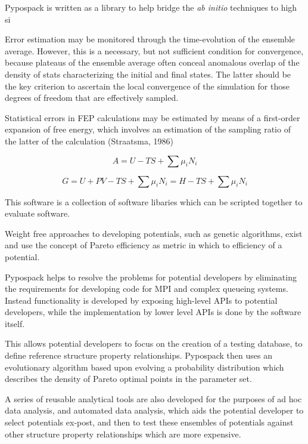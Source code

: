 Pypospack is written as a library to help bridge the \emph{ab initio} techniques to high si



Error estimation may be monitored through the time-evolution of the ensemble average.  However, this is a necessary, but not sufficient condition for convergence, because plateaus of the ensemble average often conceal anomalous overlap of the density of stats characterizing the initial and final states.  The latter should be the key criterion to ascertain the local convergence of the simulation for those degrees of freedom that are effectively sampled.

Statistical errors in FEP calculations may be estimated by means of a first-order expansion of free energy, which involves an estimation of the sampling ratio of the latter of the calculation (Straatsma, 1986)

\begin{equation}\label{eq:helmoholtz_free_energy}
  A = U-TS + \sum \mu_i N_i
\end{equation}

\begin{equation}\label{eq:gibbs_free_energy}
  G = U+PV-TS + \sum \mu_i N_i = H - TS + \sum \mu_i N_i
\end{equation}

This software is a collection of software libaries which can be scripted together to evaluate software.

Weight free approaches to developing potentials, such as genetic algorithms, exist and use the concept of Pareto efficiency as metric in which to efficiency of a potential.

Pypospack helps to resolve the problems for potential developers by eliminating the requirements for developing code for MPI and complex queueing systems.  Instead functionality is developed by exposing high-level APIs to potential developers, while the implementation by lower level APIs is done by the software itself.

This allows potential developers to focus on the creation of a testing database, to define reference structure property relationships.  Pypospack then uses an evolutionary algorithm based upon evolving a probability distribution which describes the density of Pareto optimal points in the parameter set.

A series of reusable analytical tools are also developed for the purposes of ad hoc data analysis, and automated data analysis, which aids the potential developer to select potentials ex-post, and then to test these ensembles of potentials against other structure property relationships which are more expensive.

